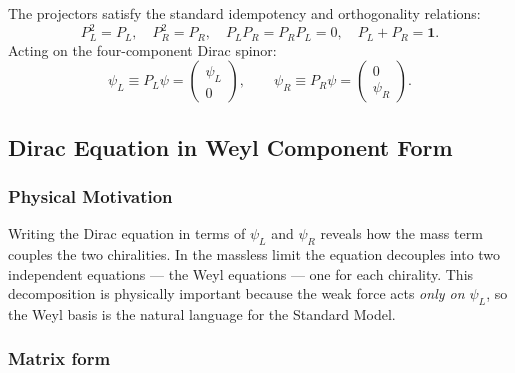 \documentclass[../main.tex]{subfiles}
\begin{document}
The projectors satisfy the standard idempotency and orthogonality relations:
\begin{equation}
  P_L^2 = P_L, \quad P_R^2 = P_R, \quad P_L P_R = P_R P_L = 0, \quad P_L + P_R = \mathbf{1}.
  \label{eq:lec08:proj-props}
\end{equation}
Acting on the four-component Dirac spinor:
\begin{equation}
  \psi_L \equiv P_L\psi = \begin{pmatrix}\psi_L\\0\end{pmatrix}, \qquad
  \psi_R \equiv P_R\psi = \begin{pmatrix}0\\\psi_R\end{pmatrix}.
  \label{eq:lec08:weyl-proj}
\end{equation}

\subsection*{Dirac Equation in Weyl Component Form}

\subsubsection*{Physical Motivation}

Writing the Dirac equation in terms of $\psi_L$ and $\psi_R$ reveals how the mass term couples the two chiralities.  In the massless limit the equation decouples into two independent equations — the Weyl equations — one for each chirality.  This decomposition is physically important because the weak force acts \emph{only on $\psi_L$}, so the Weyl basis is the natural language for the Standard Model.

\subsubsection*{Matrix form}
\end{document}
